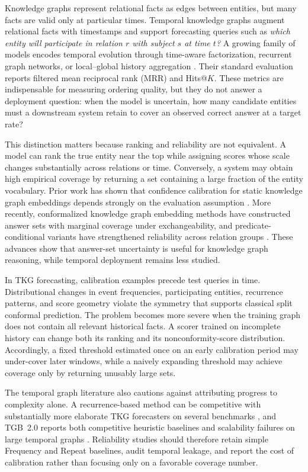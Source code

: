 \documentclass[10pt,twocolumn]{article}
\begin{document}
Knowledge graphs represent relational facts as edges between entities, but many
facts are valid only at particular times. Temporal knowledge graphs augment
relational facts with timestamps and support forecasting queries such as
\emph{which entity will participate in relation \(r\) with subject \(s\) at
time \(t\)?} A growing family of models encodes temporal evolution through
time-aware factorization, recurrent graph networks, or local--global history
aggregation \cite{garciaduran2018sequence,li2021regcn,li2022tirgn,cai2023survey}.
Their standard evaluation reports filtered mean reciprocal rank (MRR) and
Hits@\(K\). These metrics are indispensable for measuring ordering quality, but
they do not answer a deployment question: when the model is uncertain, how many
candidate entities must a downstream system retain to cover an observed correct
answer at a target rate?

This distinction matters because ranking and reliability are not equivalent.
A model can rank the true entity near the top while assigning scores whose scale
changes substantially across relations or time. Conversely, a system may obtain
high empirical coverage by returning a set containing a large fraction of the
entity vocabulary. Prior work has shown that confidence calibration for static
knowledge graph embeddings depends strongly on the evaluation assumption
\cite{safavi2020calibration}. More recently, conformalized knowledge graph
embedding methods have constructed answer sets with marginal coverage under
exchangeability, and predicate-conditional variants have strengthened
reliability across relation groups \cite{zhu2025kgcp,zhu2025condkgcp}. These
advances show that answer-set uncertainty is useful for knowledge graph
reasoning, while temporal deployment remains less studied.

In TKG forecasting, calibration examples precede test queries in time.
Distributional changes in event frequencies, participating entities, recurrence
patterns, and score geometry violate the symmetry that supports classical split
conformal prediction. The problem becomes more severe when the training graph
does not contain all relevant historical facts. A scorer trained on incomplete
history can change both its ranking and its nonconformity-score distribution.
Accordingly, a fixed threshold estimated once on an early calibration period may
under-cover later windows, while a naively expanding threshold may achieve
coverage only by returning unusably large sets.

The temporal graph literature also cautions against attributing progress to
complexity alone. A recurrence-based method can be competitive with substantially
more elaborate TKG forecasters on several benchmarks
\cite{gastinger2024repeat}, and TGB~2.0 reports both competitive heuristic
baselines and scalability failures on large temporal graphs
\cite{gastinger2024tgb2}. Reliability studies should therefore retain simple
Frequency and Repeat baselines, audit temporal leakage, and report the cost of
calibration rather than focusing only on a favorable coverage number.
\end{document}
